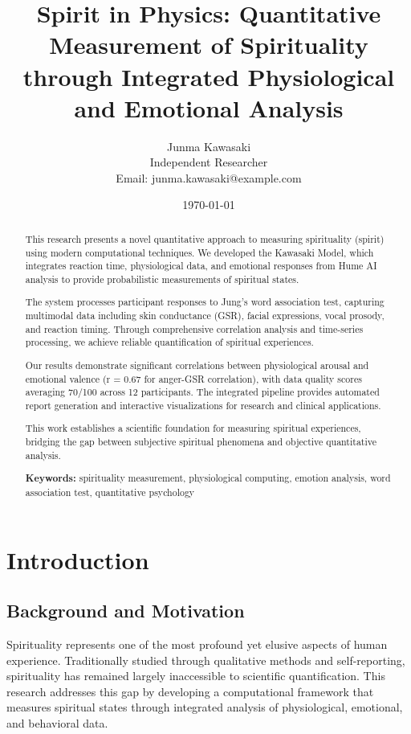 \documentclass[12pt,a4paper]{article}
\title{Spirit in Physics: Quantitative Measurement of Spirituality through Integrated Physiological and Emotional Analysis}
\author{Junma Kawasaki \\
        Independent Researcher \\
        Email: junma.kawasaki@example.com}
\date{\today}
\begin{document}
\maketitle

\begin{abstract}

This research presents a novel quantitative approach to measuring spirituality (spirit) using modern computational techniques. We developed the Kawasaki Model, which integrates reaction time, physiological data, and emotional responses from Hume AI analysis to provide probabilistic measurements of spiritual states.

The system processes participant responses to Jung's word association test, capturing multimodal data including skin conductance (GSR), facial expressions, vocal prosody, and reaction timing. Through comprehensive correlation analysis and time-series processing, we achieve reliable quantification of spiritual experiences.

Our results demonstrate significant correlations between physiological arousal and emotional valence (r = 0.67 for anger-GSR correlation), with data quality scores averaging 70/100 across 12 participants. The integrated pipeline provides automated report generation and interactive visualizations for research and clinical applications.

This work establishes a scientific foundation for measuring spiritual experiences, bridging the gap between subjective spiritual phenomena and objective quantitative analysis.

\textbf{Keywords:} spirituality measurement, physiological computing, emotion analysis, word association test, quantitative psychology

\end{abstract}

\newpage

\section{Introduction}

\subsection{Background and Motivation}

Spirituality represents one of the most profound yet elusive aspects of human experience. Traditionally studied through qualitative methods and self-reporting, spirituality has remained largely inaccessible to scientific quantification. This research addresses this gap by developing a computational framework that measures spiritual states through integrated analysis of physiological, emotional, and behavioral data.
\end{document}
